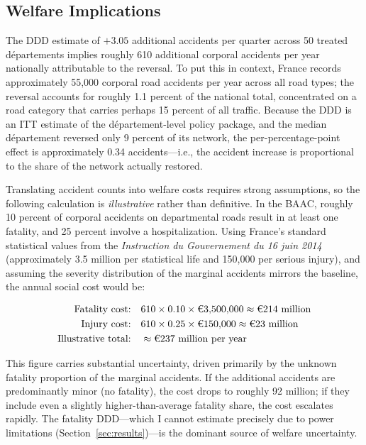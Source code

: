 \documentclass[12pt]{article}
\begin{document}
\subsection{Welfare Implications}

The DDD estimate of $+3.05$ additional accidents per quarter across 50 treated d\'{e}partements implies roughly 610 additional corporal accidents per year nationally attributable to the reversal. To put this in context, France records approximately 55,000 corporal road accidents per year across all road types; the reversal accounts for roughly 1.1 percent of the national total, concentrated on a road category that carries perhaps 15 percent of all traffic. Because the DDD is an ITT estimate of the d\'{e}partement-level policy package, and the median d\'{e}partement reversed only 9 percent of its network, the per-percentage-point effect is approximately 0.34 accidents---i.e., the accident increase is proportional to the share of the network actually restored.

Translating accident counts into welfare costs requires strong assumptions, so the following calculation is \textit{illustrative} rather than definitive. In the BAAC, roughly 10 percent of corporal accidents on departmental roads result in at least one fatality, and 25 percent involve a hospitalization. Using France's standard statistical values from the \textit{Instruction du Gouvernement du 16 juin 2014} (approximately \texteuro{}3.5 million per statistical life and \texteuro{}150,000 per serious injury), and assuming the severity distribution of the marginal accidents mirrors the baseline, the annual social cost would be:

\begin{align*}
\text{Fatality cost:}& \quad 610 \times 0.10 \times \text{\texteuro}3{,}500{,}000 \approx \text{\texteuro}214 \text{ million} \\
\text{Injury cost:}& \quad 610 \times 0.25 \times \text{\texteuro}150{,}000 \approx \text{\texteuro}23 \text{ million} \\
\text{Illustrative total:}& \quad \approx \text{\texteuro}237 \text{ million per year}
\end{align*}

This figure carries substantial uncertainty, driven primarily by the unknown fatality proportion of the marginal accidents. If the additional accidents are predominantly minor (no fatality), the cost drops to roughly \texteuro{}92 million; if they include even a slightly higher-than-average fatality share, the cost escalates rapidly. The fatality DDD---which I cannot estimate precisely due to power limitations (Section~\ref{sec:results})---is the dominant source of welfare uncertainty.
\end{document}
